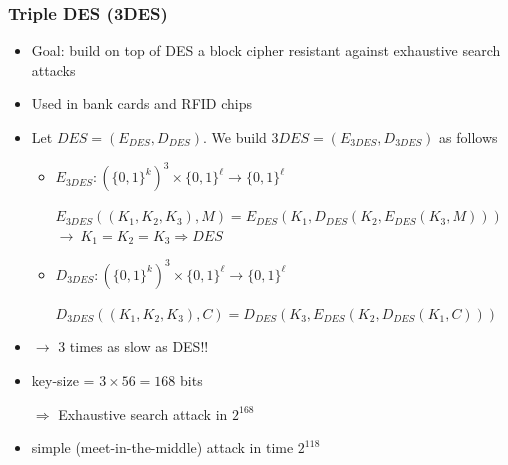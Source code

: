 \documentclass[aspectratio=169, lualatex, handout, 10pt,dvipsnames,svgnames]{beamer} %
\def\enrouge#1{\textcolor{rouge}{#1}}
\begin{document}
\begin{frame}

  \frametitle{Triple DES (3DES)}
  
  \begin{itemize}
  \item Goal: build on top of DES a block cipher resistant against exhaustive search attacks
    \medskip{}
    \pause

  \item Used in bank cards and RFID chips
    \medskip{}
    \pause

  \item Let $DES = (E_{DES}, D_{DES})$. We build $3DES = (E_{3DES}, D_{3DES})$ as follows
    \smallskip{}
    \pause
    \begin{itemize}
    \item $E_{3DES}: (\{0, 1\}^k)^3 \times \{0, 1\}^\ell \rightarrow \{0, 1\}^\ell $

      $E_{3DES}((K_1, K_2, K_3), M) = E_{DES}(K_1, D_{DES}(K_2, E_{DES}(K_3, M)))$
\pause
      $\longrightarrow\ K_1 = K_2 = K_3 \Rightarrow DES$
      \smallskip{}
      \pause

    \item $D_{3DES}: (\{0, 1\}^k)^3 \times \{0, 1\}^\ell \rightarrow \{0, 1\}^\ell $

      $D_{3DES}((K_1, K_2, K_3), C) = D_{DES}(K_3, E_{DES}(K_2, D_{DES}(K_1, C)))$
      \medskip{}
      \pause
    \end{itemize}

  \item[] \enrouge{$\longrightarrow$ 3 times as slow as DES!!}
    \medskip{}
    \pause

  \item key-size = $3\times 56=168$ bits
    
    $\Rightarrow$ Exhaustive search attack in $2^{168}$
    \medskip{}
    \pause
  \item simple (meet-in-the-middle) attack in time $2^{118}$
  \end{itemize}

\end{frame}
\end{document}
